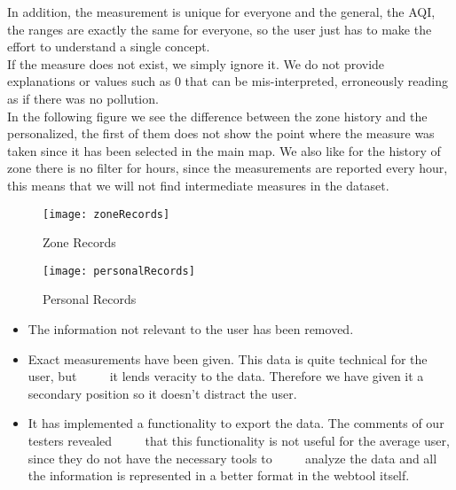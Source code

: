 In addition, the measurement is unique for everyone and the general, the AQI, the ranges are exactly the same for everyone, so the user just has to make the effort to understand a single concept.\\

If the measure does not exist, we simply ignore it. We do not provide explanations or values such as 0 that can be mis-interpreted, erroneously reading as if there was no pollution.\\

In the following figure we see the difference between the zone history and the personalized, the first of them does not show
the point where the measure was taken since it has been selected in the main map. We also like for the history of
zone there is no filter for hours, since the measurements are reported every hour, this means that we will not find
intermediate measures in the dataset.\\

\begin{figure}[ht]
    \centering
    \texttt{[image: zoneRecords]}
    \caption{Zone Records}
\end{figure}

\begin{figure}[ht]
    \centering
    \texttt{[image: personalRecords]}
    \caption{Personal Records}
\end{figure}

\begin{itemize}
    \item The information not relevant to the user has been removed.
    \item Exact measurements have been given. This data is quite technical for the user, but 
          it lends veracity to the data. Therefore we have given it a secondary position so it doesn't distract the user.
    \item It has implemented a functionality to export the data. The comments of our testers revealed
          that this functionality is not useful for the average user, since they do not have the necessary tools to
          analyze the data and all the information is represented in a better format in the webtool itself.
\end{itemize}